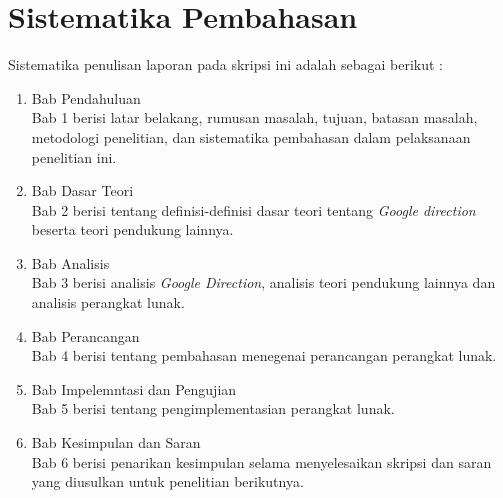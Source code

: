 \section{Sistematika Pembahasan}
\label{sec:sispem}
Sistematika penulisan laporan pada skripsi ini adalah sebagai berikut :
\begin{enumerate}
	\item Bab Pendahuluan\\
	Bab 1 berisi latar belakang, rumusan masalah, tujuan, batasan masalah, metodologi penelitian, dan sistematika pembahasan dalam pelaksanaan penelitian ini.
	\item Bab Dasar Teori\\
	Bab 2 berisi tentang definisi-definisi dasar teori tentang \textit{Google direction} beserta teori pendukung lainnya.
	\item Bab Analisis\\
	Bab 3 berisi analisis \textit{Google Direction}, analisis teori pendukung lainnya dan analisis perangkat lunak.
	\item Bab Perancangan\\
	Bab 4 berisi tentang pembahasan menegenai perancangan perangkat lunak.
	\item Bab Impelemntasi dan Pengujian\\
	Bab 5 berisi tentang pengimplementasian perangkat lunak.
	\item Bab Kesimpulan dan Saran\\
	Bab 6 berisi penarikan kesimpulan selama menyelesaikan skripsi dan saran yang diusulkan untuk penelitian berikutnya.
\end{enumerate}